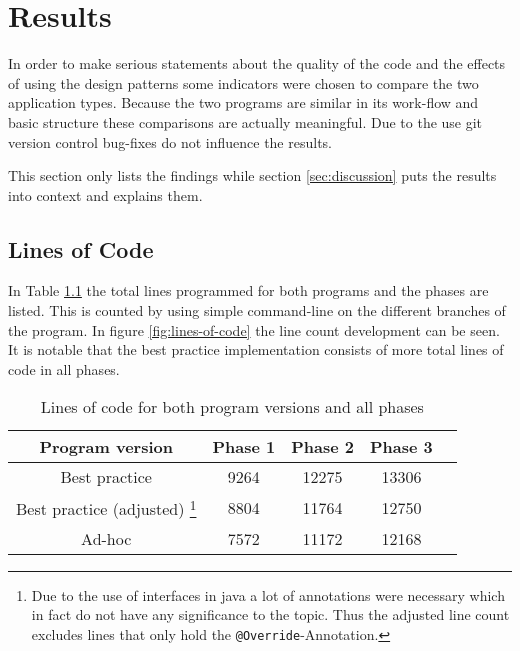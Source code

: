 \chapter{Results}
\label{sec:results}
In order to make serious statements about the quality of the code and the effects of using the design patterns some indicators were chosen to compare the two application types. Because the two programs are similar in its work-flow and basic structure these comparisons are actually meaningful. Due to the use git version control bug-fixes do not influence the results. 

This section only lists the findings while section \ref{sec:discussion} puts the results into context and explains them.

\section{Lines of Code}
\label{sec:line-count}
In Table \ref{table:lines-of-code} the total lines programmed for both programs and the phases are listed. This is counted by using simple command-line on the different branches of the program. In figure \ref{fig:lines-of-code} the line count development can be seen. It is notable that the best practice implementation consists of more total lines of code in all phases. 

\begin{table}[htbp]
	\centering

	\begin{tabular}{|c|c|c|c|c|} \hline
	\textbf{Program version} &\textbf{Phase 1} & \textbf{Phase 2} & \textbf{Phase 3} \\ \hline
	Best practice & 9264 & 12275 & 13306 \\ \hline
	Best practice (adjusted) \footnote{Due to the use of interfaces in java a lot of annotations were necessary which in fact do not have any significance to the topic. Thus the adjusted line count excludes lines that only hold the \texttt{@Override}-Annotation.} & 8804 & 11764 & 12750 \\ \hline
	Ad-hoc & 7572 & 11172 & 12168 \\ \hline
	\end{tabular}
	\caption{Lines of code for both program versions and all phases}
	\label{table:lines-of-code}
\end{table}

